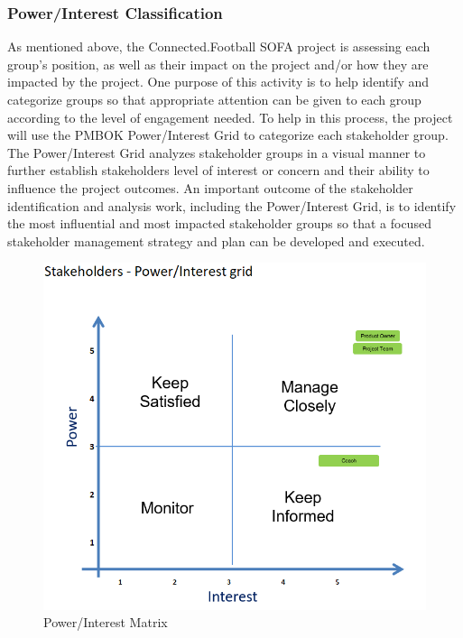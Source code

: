 \subsubsection{Power/Interest Classification}
As mentioned above, the Connected.Football SOFA project is assessing each group’s position, as well as their impact on the project and/or how they are impacted by the project.  One purpose of this activity is to help identify and categorize groups so that appropriate attention can be given to each group according to the level of engagement needed.  To help in this process, the project will use the PMBOK Power/Interest Grid to categorize each stakeholder group.  The Power/Interest Grid analyzes stakeholder groups in a visual manner to further establish stakeholders level of interest or concern and their ability to influence the project outcomes. 
\newline
An important outcome of the stakeholder identification and analysis work, including the Power/Interest Grid, is to identify the most influential and most impacted stakeholder groups so that a focused stakeholder management strategy and plan can be developed and executed.

\begin{figure}[H]
  \includegraphics[width=\linewidth]{content/diagram/stakeholder/power_interest.png}
  \caption{Power/Interest Matrix}
\end{figure}

